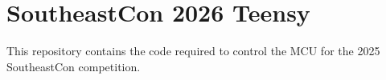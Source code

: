 \chapter{Southeast\+Con 2026 Teensy}
\hypertarget{md__r_e_a_d_m_e}{}\label{md__r_e_a_d_m_e}
\label{md__r_e_a_d_m_e_autotoc_md0}%
%


This repository contains the code required to control the MCU for the 2025 Southeast\+Con competition. 